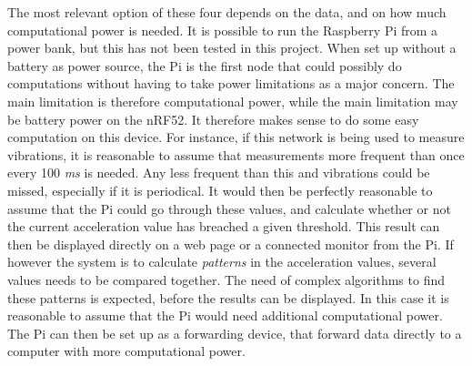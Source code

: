 \noindent The most relevant option of these four depends on the data, and on how much computational power is needed. It is possible to run the Raspberry Pi from a power bank, but this has not been tested in this project. When set up without a battery as power source, the Pi is the first node that could possibly do computations without having to take power limitations as a major concern. The main limitation is therefore computational power, while the main limitation may be battery power on the nRF52. It therefore makes sense to do some easy computation on this device. For instance, if this network is being used to measure vibrations, it is reasonable to assume that measurements more frequent than once every 100 \textit{ms} is needed. Any less frequent than this and vibrations could be missed, especially if it is periodical. It would then be perfectly reasonable to assume that the Pi could go through these values, and calculate whether or not the current acceleration value has breached a given threshold. This result can then be displayed directly on a web page or a connected monitor from the Pi. If however the system is to calculate \textit{patterns} in the acceleration values, several values needs to be compared together. The need of complex algorithms to find these patterns is expected, before the results can be displayed. In this case it is reasonable to assume that the Pi would need additional computational power. The Pi can then be set up as a forwarding device, that forward data directly to a computer with more computational power. 









